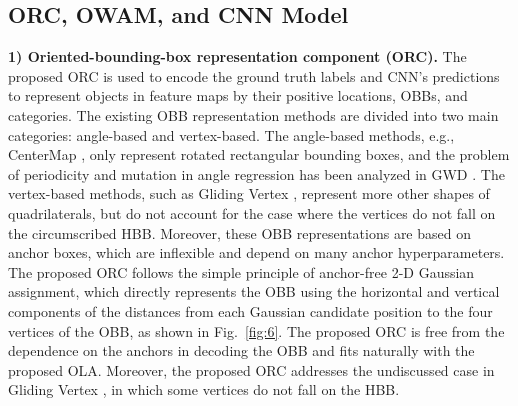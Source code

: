 \subsection{ORC, OWAM, and CNN Model}
\textbf{1) Oriented-bounding-box representation component (ORC).} The proposed ORC is used to encode the ground truth labels and CNN’s predictions to represent objects in feature maps by their positive locations, OBBs, and categories. The existing OBB representation methods are divided into two main categories: angle-based and vertex-based. The angle-based methods, e.g., CenterMap \cite{wang2020learning}, only represent rotated rectangular bounding boxes, and the problem of periodicity and mutation in angle regression has been analyzed in GWD \cite{yang2021rethinking}. The vertex-based methods, such as Gliding Vertex \cite{xu2020gliding}, represent more other shapes of quadrilaterals, but do not account for the case where the vertices do not fall on the circumscribed HBB. Moreover, these OBB representations are based on anchor boxes, which are inflexible and depend on many anchor hyperparameters. The proposed ORC follows the simple principle of anchor-free 2-D Gaussian assignment, which directly represents the OBB using the horizontal and vertical components of the distances from each Gaussian candidate position to the four vertices of the OBB, as shown in Fig.~\ref{fig:6}. The proposed ORC is free from the dependence on the anchors in decoding the OBB and fits naturally with the proposed OLA. Moreover, the proposed ORC addresses the undiscussed case in Gliding Vertex \cite{xu2020gliding}, in which some vertices do not fall on the HBB.

